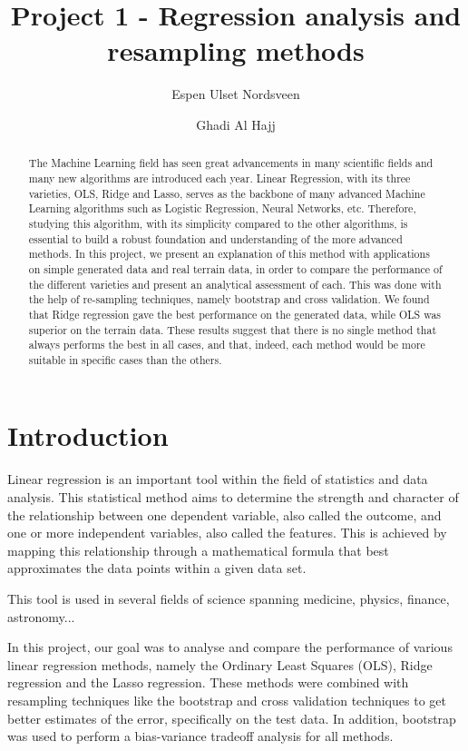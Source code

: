 \documentclass{article}
\title{Project 1 - Regression analysis and resampling methods}
\author{Espen Ulset Nordsveen
\and Ghadi Al Hajj}
\begin{document}
\maketitle
\begin{abstract}
The Machine Learning field has seen great advancements in many scientific fields and many new algorithms are introduced each year. Linear Regression, with its three varieties, OLS, Ridge and Lasso, serves as the backbone of many advanced Machine Learning algorithms such as Logistic Regression, Neural Networks, etc. Therefore, studying this algorithm, with its simplicity compared to the other algorithms, is essential to build a robust foundation and understanding of the more advanced methods. In this project, we present an explanation of this method with applications on simple generated data and real terrain data, in order to compare the performance of the different varieties and present an analytical assessment of each. This was done with the help of re-sampling techniques, namely bootstrap and cross validation. We found that Ridge regression gave the best performance on the generated data, while OLS was superior on the terrain data. These results suggest that there is no single method that always performs the best in all cases, and that, indeed, each method would be more suitable in specific cases than the others.
\end{abstract}

\section{Introduction}
Linear regression is an important tool within the field of statistics and data analysis. This statistical method aims to determine the strength and character of the relationship between one dependent variable, also called the outcome, and one or more independent variables, also called the features. This is achieved by mapping this relationship through a mathematical formula that best approximates the data points within a given data set.

This tool is used in several fields of science spanning medicine, physics, finance, astronomy...

In this project, our goal was to analyse and compare the performance of various linear regression methods, namely the Ordinary Least Squares (OLS), Ridge regression and the Lasso regression. These methods were combined with resampling techniques like the bootstrap and cross validation techniques to get better estimates of the error, specifically on the test data. In addition, bootstrap was used to perform a bias-variance tradeoff analysis for all methods.
\end{document}
